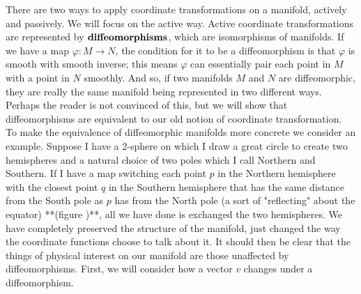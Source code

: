 There are two ways to apply coordinate transformations on a manifold, actively and passively.  We will focus on the active way.  Active coordinate transformations are represented by $\textbf{diffeomorphisms}\index{diffeomorphism}$, which are isomorphisms of manifolds.  If we have a map $\varphi: M \to N$, the condition for it to be a diffeomorphism is that $\varphi$ is smooth with smooth inverse;  this means $\varphi$ can essentially pair each point in $M$ with a point in $N$ smoothly.  And so, if two manifolds $M$ and $N$ are diffeomorphic, they are really the same manifold being represented in two different ways.  Perhaps the reader is not convinced of this, but we will show that diffeomorphisms are equivalent to our old notion of coordinate transformation.\\

  To make the equivalence of diffeomorphic manifolds more concrete we consider an example.  Suppose I have a 2-sphere on which I draw a great circle to create two hemispheres and a natural choice of two poles which I call Northern and Southern.  If I have a map switching each point $p$ in the Northern hemisphere with the closest point $q$ in the Southern hemisphere that has the same distance from the South pole as $p$ has from the North pole (a sort of "reflecting" about the equator) **(figure )**, all we have done is exchanged the two hemispheres.  We have completely preserved the structure of the manifold, just changed the way the coordinate functions choose to talk about it.  It should then be clear that the things of physical interest on our manifold are those unaffected by diffeomorphisms.  First, we will consider how a vector $v$ changes under a diffeomorphism.\\
  
